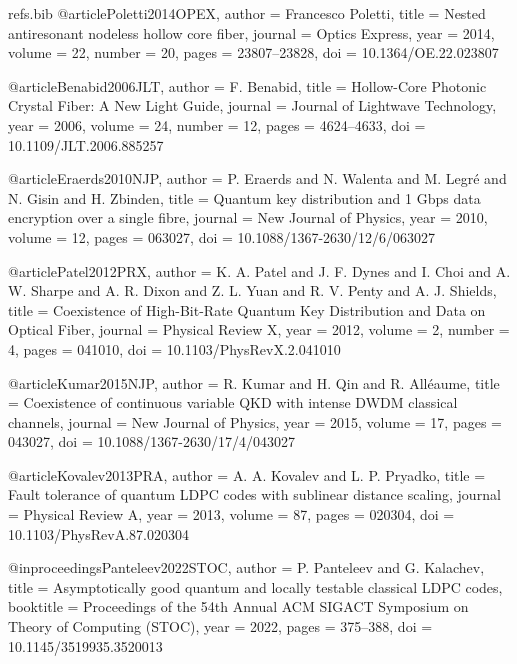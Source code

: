 \begin{filecontents*}{refs.bib}
@article{Poletti2014OPEX,
  author    = {Francesco Poletti},
  title     = {Nested antiresonant nodeless hollow core fiber},
  journal   = {Optics Express},
  year      = {2014},
  volume    = {22},
  number    = {20},
  pages     = {23807--23828},
  doi       = {10.1364/OE.22.023807}
}

@article{Benabid2006JLT,
  author    = {F. Benabid},
  title     = {Hollow-Core Photonic Crystal Fiber: A New Light Guide},
  journal   = {Journal of Lightwave Technology},
  year      = {2006},
  volume    = {24},
  number    = {12},
  pages     = {4624--4633},
  doi       = {10.1109/JLT.2006.885257}
}

@article{Eraerds2010NJP,
  author    = {P. Eraerds and N. Walenta and M. Legr{\'e} and N. Gisin and H. Zbinden},
  title     = {Quantum key distribution and 1 Gbps data encryption over a single fibre},
  journal   = {New Journal of Physics},
  year      = {2010},
  volume    = {12},
  pages     = {063027},
  doi       = {10.1088/1367-2630/12/6/063027}
}

@article{Patel2012PRX,
  author    = {K. A. Patel and J. F. Dynes and I. Choi and A. W. Sharpe and A. R. Dixon and Z. L. Yuan and R. V. Penty and A. J. Shields},
  title     = {Coexistence of High-Bit-Rate Quantum Key Distribution and Data on Optical Fiber},
  journal   = {Physical Review X},
  year      = {2012},
  volume    = {2},
  number    = {4},
  pages     = {041010},
  doi       = {10.1103/PhysRevX.2.041010}
}

@article{Kumar2015NJP,
  author    = {R. Kumar and H. Qin and R. All{\'e}aume},
  title     = {Coexistence of continuous variable QKD with intense DWDM classical channels},
  journal   = {New Journal of Physics},
  year      = {2015},
  volume    = {17},
  pages     = {043027},
  doi       = {10.1088/1367-2630/17/4/043027}
}

@article{Kovalev2013PRA,
  author    = {A. A. Kovalev and L. P. Pryadko},
  title     = {Fault tolerance of quantum LDPC codes with sublinear distance scaling},
  journal   = {Physical Review A},
  year      = {2013},
  volume    = {87},
  pages     = {020304},
  doi       = {10.1103/PhysRevA.87.020304}
}

@inproceedings{Panteleev2022STOC,
  author    = {P. Panteleev and G. Kalachev},
  title     = {Asymptotically good quantum and locally testable classical LDPC codes},
  booktitle = {Proceedings of the 54th Annual ACM SIGACT Symposium on Theory of Computing (STOC)},
  year      = {2022},
  pages     = {375--388},
  doi       = {10.1145/3519935.3520013}
}


\end{filecontents*}
